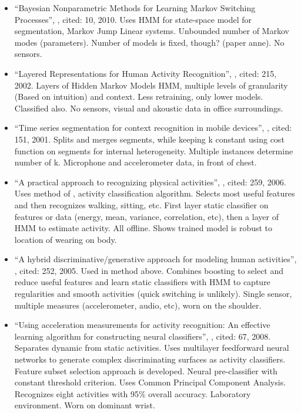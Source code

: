 \begin{itemize}
  \item ``Bayesian Nonparametric Methods for Learning Markov Switching Processes'', \cite{fox2010bayesian}, cited: 10, 2010. Uses HMM for state-space model for segmentation, Markov Jump Linear systems. Unbounded number of Markov modes (parameters). Number of models is fixed, though? (paper anne). No sensors.
  \item ``Layered Representations for Human Activity Recognition'', \cite{oliver2002layered}, cited: 215, 2002. Layers of Hidden Markov Models HMM, multiple levels of granularity (Based on intuition) and context. Less retraining, only lower models. Classified also. No sensors, visual and akoustic data in office surroundings.
  \item ``Time series segmentation for context recognition in mobile devices'', \cite{himberg2001time}, cited: 151, 2001. Splits and merges segments, while keeping k constant using cost function on segments for internal heterogeneity. Multiple instances determine number of k. Microphone and accelerometer data, in front of chest.
  \item ``A practical approach to recognizing physical activities'', \cite{lester2006practical}, cited: 259, 2006. Uses method of \cite{lester2005hybrid}, activity classification algorithm. Selects most useful features and then recognizes walking, sitting, etc. First layer static classifier on features or data (energy, mean, variance, correlation, etc), then a layer of HMM to estimate activity. All offline. Shows trained model is robust to location of wearing on body.
  \item ``A hybrid discriminative/generative approach for modeling human activities'', \cite{lester2005hybrid}, cited: 252, 2005. Used in method above. Combines boosting to select and reduce useful features and learn static classifiers with HMM to capture regularities and smooth activities (quick switching is unlikely). Single sensor, multiple measures (accelerometer, audio, etc), worn on the shoulder.
  \item ``Using acceleration measurements for activity recognition: An effective learning algorithm for constructing neural classifiers'', \cite{yang2008using}, cited: 67, 2008. Separates dynamic from static activities. Uses multilayer feedforward neural networks to generate complex discriminating surfaces as activity classifiers. Feature subset selection approach is developed. Neural pre-classifier with constant threshold criterion. Uses Common Principal Component Analysis. Recognizes eight activities with 95\% overall accuracy. Laboratory environment. Worn on dominant wrist.

\end{itemize}
